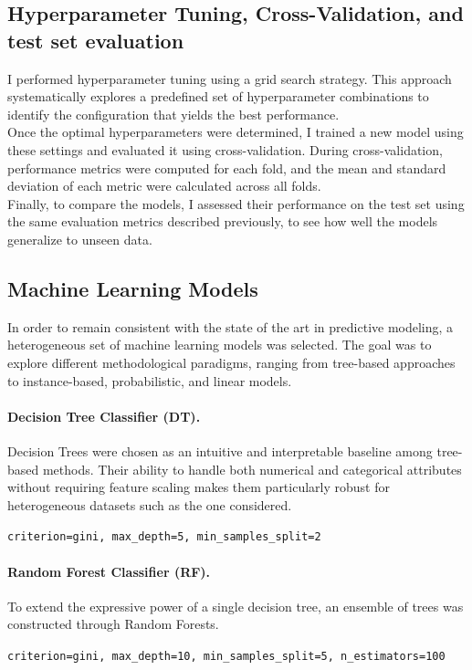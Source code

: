 \subsection{Hyperparameter Tuning, Cross-Validation, and test set evaluation}
I performed hyperparameter tuning using a grid search strategy. This approach systematically explores a predefined set of hyperparameter combinations to identify the configuration that yields the best performance.\\

\noindent Once the optimal hyperparameters were determined, I trained a new model using these settings and evaluated it using cross-validation. During cross-validation, performance metrics were computed for each fold, and the mean and standard deviation of each metric were calculated across all folds.\\

\noindent
Finally, to compare the models, I assessed their performance on the test set using the same evaluation metrics described previously, to see how well the models generalize to unseen data. 


\subsection{Machine Learning Models}
In order to remain consistent with the state of the art in predictive modeling, a heterogeneous set of machine learning models was selected. The goal was to explore different methodological paradigms, ranging from tree-based approaches to instance-based, probabilistic, and linear models. 

\paragraph{Decision Tree Classifier (DT).}
Decision Trees were chosen as an intuitive and interpretable baseline among tree-based methods. Their ability to handle both numerical and categorical attributes without requiring feature scaling makes them particularly robust for heterogeneous datasets such as the one considered.
\begin{tcolorbox}[colback=gray!5!white,colframe=gray!50!black,
                  boxrule=0.5pt,arc=2pt, left=1mm, right=1mm, top=0.5mm, bottom=0.5mm]
\texttt{criterion=gini, max\_depth=5, min\_samples\_split=2}
\end{tcolorbox}

\paragraph{Random Forest Classifier (RF).}
To extend the expressive power of a single decision tree, an ensemble of trees was constructed through Random Forests. 
\begin{tcolorbox}[colback=gray!5!white,colframe=gray!50!black,
                  boxrule=0.5pt,arc=2pt, left=1mm, right=1mm, top=0.5mm, bottom=0.5mm]
\texttt{criterion=gini, max\_depth=10, min\_samples\_split=5, n\_estimators=100}
\end{tcolorbox}

